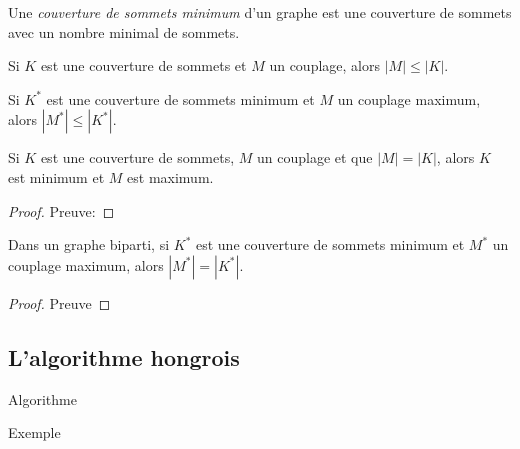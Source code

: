 \begin{mydef}
  Une \emph{couverture de sommets minimum} d’un graphe est une couverture de sommets avec un nombre minimal de sommets.
\end{mydef}

\begin{myrem}
  Si $K$ est une couverture de sommets et $M$ un couplage, alors $|M| \leq |K|$.
\end{myrem}

\begin{myrem}
  Si $K^*$ est une couverture de sommets minimum et $M$ un couplage maximum, alors $|M^*| \leq |K^*|$.
\end{myrem}

\begin{mylem}
  Si $K$ est une couverture de sommets, $M$ un couplage et que $|M| = |K|$, alors $K$ est minimum et $M$ est maximum.
  \begin{proof}
     Preuve:
  \end{proof}
\end{mylem}

\begin{mytheo} [König]
  Dans un graphe biparti, si $K^*$ est une couverture de sommets minimum et $M^*$ un couplage maximum, alors $|M^*| = |K^*|$.
  \begin{proof}
     Preuve \addTODO
  \end{proof}
\end{mytheo}

\subsection{L'algorithme hongrois}
\begin{myalgo}
  Algorithme \addTODO
\end{myalgo}
\begin{myexem}
  Exemple \addTODO
\end{myexem}
